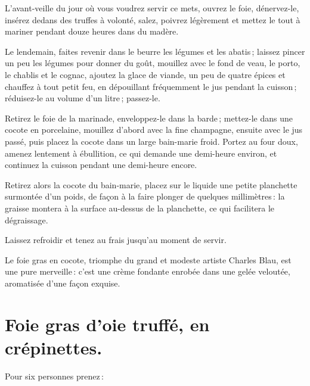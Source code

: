 L'avant-veille du jour où vous voudrez servir ce mets, ouvrez le foie,
dénervez-le, insérez dedans des truffes à volonté, salez, poivrez légèrement et
mettez le tout à mariner pendant douze heures dans du madère.

Le lendemain, faites revenir dans le beurre les légumes et les abatis ; laissez
pincer un peu les légumes pour donner du goût, mouillez avec le fond de veau,
le porto, le chablis et le cognac, ajoutez la glace de viande, un peu de quatre
épices et chauffez à tout petit feu, en dépouillant fréquemment le jus pendant
la cuisson ; réduisez-le au volume d'un litre ; passez-le.

Retirez le foie de la marinade, enveloppez-le dans la barde ; mettez-le dans
une cocote en porcelaine, mouillez d’abord avec la fine champagne, ensuite avec
le jus passé, puis placez la cocote dans un large bain-marie froid. Portez au
four doux, amenez lentement à ébullition, ce qui demande une demi-heure
environ, et continuez la cuisson pendant une demi-heure encore.

Retirez alors la cocote du bain-marie, placez sur le liquide une petite
planchette surmontée d'un poids, de façon à la faire plonger de quelques
millimètres : la graisse montera à la surface au-dessus de la planchette, ce
qui facilitera le dégraissage.

Laissez refroidir et tenez au frais jusqu'au moment de servir.

Le foie gras en cocote, triomphe du grand et modeste artiste Charles Blau, est
une pure merveille : c'est une crème fondante enrobée dans une gelée veloutée,
aromatisée d'une façon exquise.

\section*{\centering Foie gras d'oie truffé, en crépinettes.}
{}

Pour six personnes prenez :

\medskip

